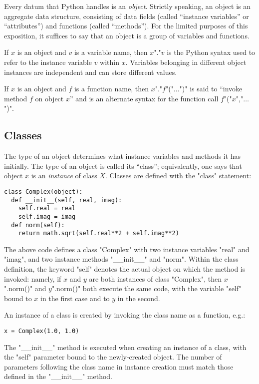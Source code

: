 {Every datum that Python handles is an \emph{object}.  Strictly
speaking, an object is an aggregate data structure, consisting of data
fields (called ``instance variables'' or ``attributes'') and functions
(called ``methods'').  For the limited purposes of this exposition, it
suffices to say that an object is a group of variables and functions.

If $x$ is an object and $v$ is a variable name, then $x$"."$v$ is
the Python syntax used to refer to the instance variable $v$ within
$x$. Variables belonging in different object instances are independent
and can store different values.

If $x$ is an object and $f$ is a function name, then
$x$"."$f$"("$\ldots$")" is said to ``invoke method $f$ on object $x$''
and is an alternate syntax for the function call $f$"("$x$","$\ldots$")".

\subsection{Classes}
\label{sec:classes}

The type of an object determines what instance variables and methods
it has initially.  The type of an object is called its ``class'';
equivalently, one says that object $x$ is an \emph{instance} of class
$X$.  Classes are defined with the "class" statement:
\begin{lstlisting}
class Complex(object):
  def __init__(self, real, imag):
    self.real = real
    self.imag = imag
  def norm(self):
    return math.sqrt(self.real**2 + self.imag**2)
\end{lstlisting}
The above code defines a class "Complex" with two instance variables
"real" and "imag", and two instance methods "__init__" and
"norm".  Within the class definition, the keyword "self" denotes
the actual object on which the method is invoked: namely, if $x$ and
$y$ are both instances of class "Complex", then $x$".norm()" and
$y$".norm()" both execute the same code, with the variable "self"
bound to $x$ in the first case and to $y$ in the second. 

An instance of a class is created by invoking the class name as a
function, e.g.:
\begin{lstlisting}
x = Complex(1.0, 1.0)
\end{lstlisting}
The "__init__" method is executed when creating an instance of a
class, with the "self" parameter bound to the newly-created object.
The number of parameters following the class name in instance creation
must match those defined in the "__init__" method.

}
